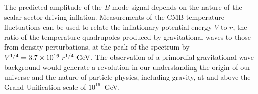 
The predicted amplitude of the $B$-mode signal depends on the nature of the scalar sector driving inflation. Measurements of the CMB temperature fluctuations can be used to relate the inflationary potential energy $V$ to $r$, the ratio of the temperature quadrupoles produced by gravitational waves to those from density perturbations, at the peak of the spectrum by $V^{1/4} = 3.7 \times 10^{16} \ r^{1/4}\,\, {\rm GeV}$. The observation of a primordial gravitational wave background would generate a revolution in our understanding the origin of our universe and the nature of particle physics, including gravity, at and above the Grand Unification scale of $10^{16}$~GeV.  

